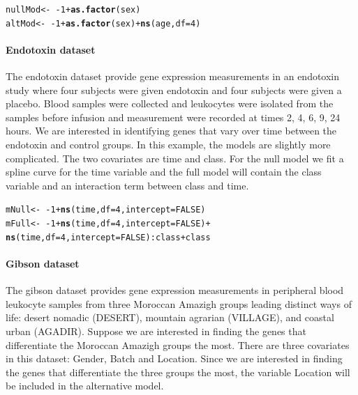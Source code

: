 \documentclass{article}\usepackage[]{graphicx}\usepackage[]{color}
\makeatletter
\newcommand{\hlnum}[1]{\textcolor[rgb]{0.686,0.059,0.569}{#1}}%
\newcommand{\hlopt}[1]{\textcolor[rgb]{0,0,0}{#1}}%
\newcommand{\hlstd}[1]{\textcolor[rgb]{0.345,0.345,0.345}{#1}}%
\newcommand{\hlkwb}[1]{\textcolor[rgb]{0.69,0.353,0.396}{#1}}%
\newcommand{\hlkwc}[1]{\textcolor[rgb]{0.333,0.667,0.333}{#1}}%
\newcommand{\hlkwd}[1]{\textcolor[rgb]{0.737,0.353,0.396}{\textbf{#1}}}%
\newenvironment{kframe}{%
 \def\at@end@of@kframe{}%
 \ifinner\ifhmode%
  \def\at@end@of@kframe{\end{minipage}}%
  \begin{minipage}{\columnwidth}%
 \fi\fi%
 \def\FrameCommand##1{\hskip\@totalleftmargin \hskip-\fboxsep
 \colorbox{shadecolor}{##1}\hskip-\fboxsep
     \hskip-\linewidth \hskip-\@totalleftmargin \hskip\columnwidth}%
 \MakeFramed {\advance\hsize-\width
   \@totalleftmargin\z@ \linewidth\hsize
   \@setminipage}}%
 {\par\unskip\endMakeFramed%
 \at@end@of@kframe}
\newenvironment{knitrout}{}{} %
\makeatother
\begin{document}
\begin{knitrout}
\color{fgcolor}\begin{kframe}
\begin{alltt}
\hlstd{nullMod} \hlkwb{<-} \hlopt{~-}\hlnum{1} \hlopt{+} \hlkwd{as.factor}\hlstd{(sex)}
\hlstd{altMod} \hlkwb{<-} \hlopt{~-}\hlnum{1} \hlopt{+} \hlkwd{as.factor}\hlstd{(sex)} \hlopt{+} \hlkwd{ns}\hlstd{(age,} \hlkwc{df} \hlstd{=} \hlnum{4}\hlstd{)}
\end{alltt}
\end{kframe}
\end{knitrout}

\paragraph{Endotoxin dataset} The endotoxin dataset provide gene expression measurements in an endotoxin study where four subjects were given endotoxin and four subjects were given a placebo. Blood samples were collected and leukocytes were isolated from the samples before infusion and measurement were recorded at times 2, 4, 6, 9, 24 hours. We are interested in identifying genes that vary over time between the endotoxin and control groups. In this example, the models are slightly more complicated. The two covariates are time and class. For the null model we fit a spline curve for the time variable and the full model will contain the class variable and an interaction term between class and time. 

\begin{knitrout}
\color{fgcolor}\begin{kframe}
\begin{alltt}
\hlstd{mNull} \hlkwb{<-} \hlopt{~-}\hlnum{1} \hlopt{+} \hlkwd{ns}\hlstd{(time,} \hlkwc{df} \hlstd{=} \hlnum{4}\hlstd{,} \hlkwc{intercept} \hlstd{=} \hlnum{FALSE}\hlstd{)}
\hlstd{mFull} \hlkwb{<-} \hlopt{~-}\hlnum{1} \hlopt{+} \hlkwd{ns}\hlstd{(time,} \hlkwc{df} \hlstd{=} \hlnum{4}\hlstd{,} \hlkwc{intercept} \hlstd{=} \hlnum{FALSE}\hlstd{)} \hlopt{+}
    \hlkwd{ns}\hlstd{(time,} \hlkwc{df} \hlstd{=} \hlnum{4}\hlstd{,} \hlkwc{intercept} \hlstd{=} \hlnum{FALSE}\hlstd{)}\hlopt{:}\hlstd{class} \hlopt{+} \hlstd{class}
\end{alltt}
\end{kframe}
\end{knitrout}

\paragraph{Gibson dataset} The gibson dataset provides gene expression measurements in peripheral blood leukocyte samples from three Moroccan Amazigh groups leading distinct ways of life: desert nomadic (DESERT), mountain agrarian (VILLAGE), and coastal urban (AGADIR). Suppose we are interested in finding the genes that differentiate the Moroccan Amazigh groups the most. There are three covariates in this dataset: Gender, Batch and Location. Since we are interested in finding the genes that differentiate the three groups the most, the variable Location will be included in the alternative model.
\end{document}
